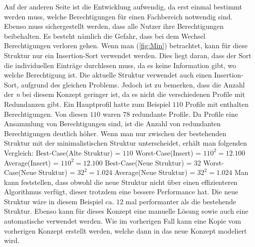 Auf der anderen Seite ist die Entwicklung aufwendig, da erst einmal bestimmt werden muss, welche Berechtigungen für einen Fachbereich notwendig sind.
Ebenso muss sichergestellt werden, dass alle Nutzer ihre Berechtigungen beibehalten.
Es besteht nämlich die Gefahr, dass bei dem Wechsel Berechtigungen verloren gehen.
\newline
\newline
Wenn man (\ref{fig:Min}) betrachtet, kann für diese Struktur nur ein Insertion-Sort verwendet werden.
Dies liegt daran, dass der Sort die individuellen Einträge durchlesen muss, da es keine Information gibt, wo welche Berechtigung ist.
Die aktuelle Struktur verwendet auch einen Insertion-Sort, aufgrund des gleichen Problems.
Jedoch ist zu bemerken, dass die Anzahl der \textit{n} bei diesem Konzept geringer ist, da es nicht die verschiedenen Profile mit Redundanzen gibt.
\newline
\newline
Ein Hauptprofil hatte zum Beispiel $110$ Profile mit enthalten Berechtigungen.
Von diesen $110$ waren $78$ redundante Profile.
Da Profile eine Ansammlung von Berechtigungen sind, ist die Anzahl von redundanten Berechtigungen deutlich höher.
Wenn man nur zwischen der bestehenden Struktur mit der minimalistischen Struktur unterscheidet, erhält man folgenden Vergleich:
\newline
\newline
Best-Case(Alte Struktur) = $110$
\newline
Worst-Case(Insert) = $110^2 = 12.100$
\newline
Average(Insert) = $110^2 = 12.100$
\newline
\newline
Best-Case(Neue Struktur) = $32$
\newline
Worst-Case(Neue Struktur) = $32^2 = 1.024$
\newline
Average(Neue Struktur) = $32^2 = 1.024$
\newline
\newline
Man kann feststellen, dass obwohl die neue Struktur nicht über einen effizienteren Algorithmus verfügt, dieser trotzdem eine bessere Performance hat.
Die neue Struktur wäre in diesem Beispiel ca. $12$ mal performanter als die bestehende Struktur.
\newline
\newline
Ebenso kann für dieses Konzept eine manuelle Lösung sowie auch eine automatische verwendet werden.
Wie im vorherigen Fall kann eine Kopie vom vorherigen Konzept erstellt werden, welche dann in das neue Konzept modeliert wird.
